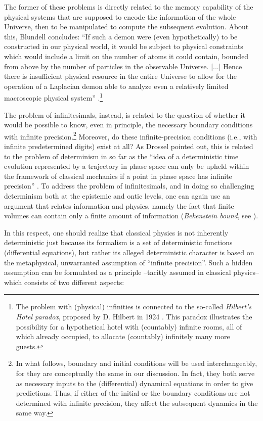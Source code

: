 \documentclass[aps,prl,twocolumn,showpacs,superscriptaddress,groupedaddress, nofootinbib]{revtex4-1}
\begin{document}
The former of these problems is directly related to the memory capability of the physical systems that are supposed to encode the information of the whole Universe, then to be manipulated to compute the subsequent evolution. About this, Blundell concludes: ``If such a demon were (even hypothetically) to be constructed in our physical world, it would be subject to physical constraints which would include a limit on the number of atoms it could contain, bounded from above by the number of particles in the observable Universe. [...] Hence there is insufficient physical resource in the entire Universe to allow for the operation of a Laplacian demon able to analyze even a relatively limited macroscopic physical system'' \cite{blundell}.\footnote{The problem with (physical) infinities is connected to the so-called \emph{Hilbert's Hotel paradox}, proposed by D. Hilbert in 1924 \cite{hilbert}. This paradox illustrates the possibility for a hypothetical hotel with (countably) infinite rooms, all of which already occupied, to allocate (countably) infinitely many more guests.}

The problem of infinitesimals, instead, is related to the question of whether it would be possible to know, even in principle, the necessary boundary conditions with infinite precision.\footnote{In what follows, boundary and initial conditions will be used interchangeably, for they are conceptually the same in our discussion. In fact, they both serve as necessary inputs to the (differential) dynamical equations in order to give predictions. Thus, if either of the initial or the boundary conditions are not determined with infinite precision, they affect the subsequent dynamics in the same way.} Moreover, do these infinite-precision conditions (i.e., with infinite predetermined digits) exist at all?  As Drossel pointed out, this is related to the problem of determinism in so far as the  ``idea of a deterministic time evolution represented by a trajectory in phase space can only be upheld within the framework of classical mechanics if a point in phase space has infinite precision'' \cite{drossel}. To address the problem of infinitesimals, and in doing so challenging determinism both at the epistemic and ontic levels, one can again use an argument that relates information and physics, namely the fact that finite volumes can contain only a finite amount of information (\emph{Bekenstein bound}, see \cite{gisin1}).

In this respect, one should realize that classical physics is not inherently deterministic just because its formalism is a set of deterministic functions (differential equations), but rather its alleged deterministic character is based on the metaphysical, unwarranted assumption of ``infinite precision''. Such a hidden assumption can be formulated as a principle  --tacitly assumed in classical physics-- which consists of two different aspects:
\end{document}
